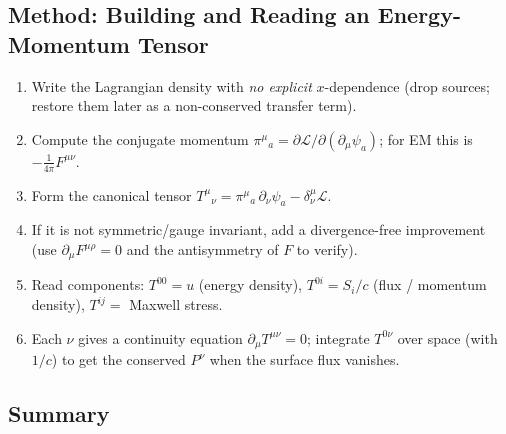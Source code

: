 \subsection*{Method: Building and Reading an Energy-Momentum Tensor}
\begin{enumerate}
  \item Write the Lagrangian density with \emph{no explicit} $x$-dependence (drop sources;
        restore them later as a non-conserved transfer term).
  \item Compute the conjugate momentum
        $\pi^{\mu}{}_{a}=\partial\mathcal L/\partial(\partial_\mu\psi_a)$; for EM this is
        $-\tfrac{1}{4\pi}F^{\mu\nu}$.
  \item Form the canonical tensor
        $T^\mu{}_\nu=\pi^{\mu}{}_a\,\partial_\nu\psi_a-\delta^\mu_\nu\mathcal L$.
  \item If it is not symmetric/gauge invariant, add a divergence-free improvement
        (use $\partial_\mu F^{\mu\rho}=0$ and the antisymmetry of $F$ to verify).
  \item Read components: $T^{00}=u$ (energy density), $T^{0i}=S_i/c$ (flux / momentum
        density), $T^{ij}=$ Maxwell stress.
  \item Each $\nu$ gives a continuity equation $\partial_\mu T^{\mu\nu}=0$; integrate
        $T^{0\nu}$ over space (with $1/c$) to get the conserved $P^\nu$ when the surface
        flux vanishes.
\end{enumerate}

\subsection*{Summary}

